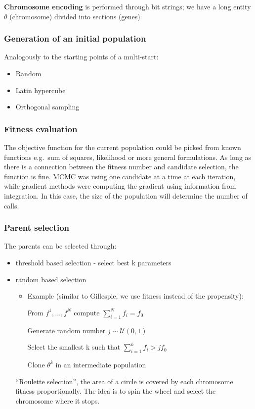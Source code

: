 \textbf{Chromosome encoding} is performed through bit strings; we have a
long entity \(\theta\) (chromosome) divided into sections (genes).


\subsubsection{Generation of an initial population}

Analogously to the starting points of a multi-start:

\begin{itemize}
\tightlist
\item
  Random
\item
  Latin hypercube
\item
  Orthogonal sampling
\end{itemize}

\subsubsection{Fitness evaluation}

The objective function for the current population could be picked from
known functions e.g.~sum of squares, likelihood or more general
formulations. As long as there is a connection between the fitness
number and candidate selection, the function is fine. MCMC was using one
candidate at a time at each iteration, while gradient methods were
computing the gradient using information from integration. In this case,
the size of the population will determine the number of calls.

\subsubsection{Parent selection}

The parents can be selected through:

\begin{itemize}
\tightlist
\item
  threshold based selection - select best k parameters
\item
  random based selection

  \begin{itemize}
  \item
    Example (similar to Gillespie, we use fitness instead of the
    propensity):

    From \(f^1,\dots,f^N\) compute \(\sum^N_{i=1}f_i=f_0\)

    Generate random number \(j \sim \mathcal{U}(0,1)\)

    Select the smallest k such that \(\sum^k_{i=1}f_i>jf_0\)

    Clone \(\theta^k\) in an intermediate population
  \end{itemize}
\noindent
  ``Roulette selection'', the area of a circle is covered by each
  chromosome fitness proportionally. The idea is to spin the wheel and
  select the chromosome where it stops.
\end{itemize}

